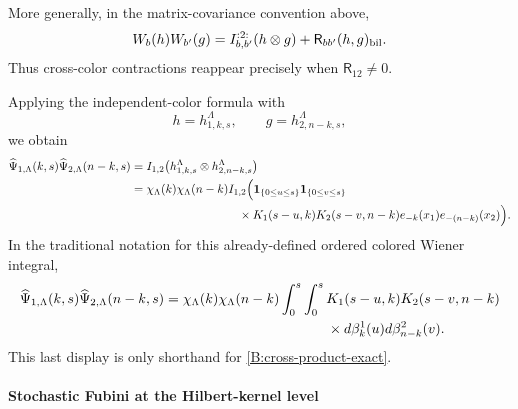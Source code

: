 \documentclass[10pt]{amsart}
\numberwithin{equation}{section}
\theoremstyle{plain}
\theoremstyle{definition}
\theoremstyle{remark}
\begin{document}
More generally, in the matrix-covariance convention above,
\[
        W_b(h)W_{b'}(g)
        =
        I_{b,b'}^{:2:}(h\otimes g)+\mathsf R_{bb'}(h,g)_{\rm bil}.
\]
Thus cross-color contractions reappear precisely when \(\mathsf R_{12}\ne0\).

Applying the independent-color formula with
\[
        h=h_{1,k,s}^{\Lambda},
        \qquad
        g=h_{2,n-k,s}^{\Lambda},
\]
we obtain
\begin{equation}\label{B:cross-product-exact}
\begin{aligned}
        \widehat\Psi_{1,\Lambda}(k,s)\widehat\Psi_{2,\Lambda}(n-k,s)
        &=
        I_{1,2}\bigl(h_{1,k,s}^{\Lambda}\otimes h_{2,n-k,s}^{\Lambda}\bigr) \\
        &=
        \chi_\Lambda(k)\chi_\Lambda(n-k)
        I_{1,2}\Bigl(
        \mathbf 1_{\{0\le u\le s\}}
        \mathbf 1_{\{0\le v\le s\}} \\
        &\hspace{3.2cm}\times
        K_1(s-u,k)K_2(s-v,n-k)e_{-k}(x_1)e_{-(n-k)}(x_2)
        \Bigr).
\end{aligned}
\end{equation}
In the traditional notation for this already-defined ordered colored Wiener integral,
\[
\begin{aligned}
        \widehat\Psi_{1,\Lambda}(k,s)\widehat\Psi_{2,\Lambda}(n-k,s)
        &=
        \chi_\Lambda(k)\chi_\Lambda(n-k)
        \int_0^s\int_0^s
        K_1(s-u,k)K_2(s-v,n-k) \\
        &\hspace{4.1cm}\times
        d\beta_k^1(u)d\beta_{n-k}^2(v).
\end{aligned}
\]
This last display is only shorthand for \eqref{B:cross-product-exact}.



\paragraph{Stochastic Fubini at the Hilbert-kernel level}
\end{document}
